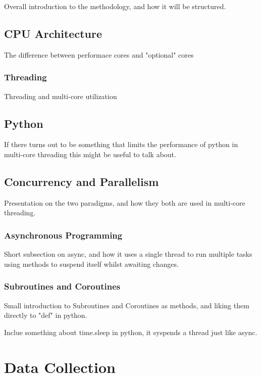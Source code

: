 \documentclass{article}
\begin{document}
Overall introduction to the methodology, and how it will be structured.

\subsection{CPU Architecture}

The difference between performace cores and "optional" cores

\subsubsection{Threading}

Threading and multi-core utilization 

\subsection{Python}

If there turns out to be something that limits the performance of python in multi-core threading this might be useful to talk about.

\subsection{Concurrency and Parallelism}

Presentation on the two paradigms, and how they both are used in multi-core threading.

\subsubsection{Asynchronous Programming}

Short subsection on async, and how it uses a single thread to run multiple tasks using methods to suspend itself whilst awaiting changes.

\subsubsection{Subroutines and Coroutines}

Small introduction to Subroutines and Coroutines as methods, and liking them directly to "def" in python.

Inclue something about time.sleep in python, it syspends a thread just like async.

\section{Data Collection}
\end{document}
